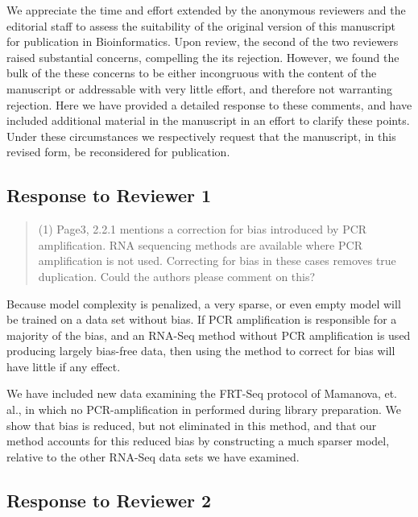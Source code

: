 \documentclass{article}
\begin{document}

We appreciate the time and effort extended by the anonymous reviewers and the
editorial staff to assess the suitability of the original version of this
manuscript for publication in Bioinformatics. Upon review, the second of the two
reviewers raised substantial concerns, compelling the its rejection.  However,
we found the bulk of the these concerns to be either incongruous with the
content of the manuscript or addressable with very little effort, and therefore
not warranting rejection. Here we have provided a detailed response to these
comments, and have included additional material in the manuscript in an effort
to clarify these points. Under these circumstances we respectively request that
the manuscript, in this revised form, be reconsidered for publication.


\subsection*{Response to Reviewer 1}

\begin{quote}
(1) Page3, 2.2.1 mentions a correction for bias introduced by PCR amplification.  RNA sequencing methods are available where PCR amplification is not used.  Correcting for bias in these cases removes true duplication.  Could the authors please comment on this?
\end{quote}

Because model complexity is penalized, a very sparse, or even empty model will
be trained on a data set without bias.  If PCR amplification is responsible for
a majority of the bias, and an RNA-Seq method without PCR amplification is used
producing largely bias-free data, then using the method to correct for bias
will have little if any effect.

We have included new data examining the FRT-Seq protocol of Mamanova, et. al.,
in which no PCR-amplification in performed during library preparation. We show
that bias is reduced, but not eliminated in this method, and that our method
accounts for this reduced bias by constructing a much sparser model, relative to
the other RNA-Seq data sets we have examined.


\subsection*{Response to Reviewer 2}
\end{document}
